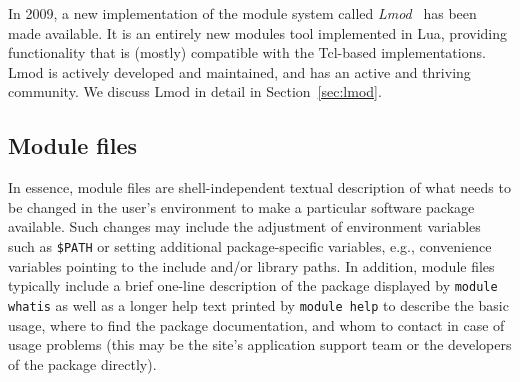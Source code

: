 In 2009, a new implementation of the module system called
\emph{Lmod}~\cite{taccLmod} has
been made available. It is an entirely new modules tool implemented in
Lua, providing functionality that is (mostly) compatible with the Tcl-based
implementations.  Lmod is actively developed and maintained, and has
an active and thriving community. We discuss Lmod in detail in
Section~\ref{sec:lmod}.


%
%

\subsection{Module files}
\label{sec:Module_files}

In essence, module files are shell-independent textual description of
what needs to be changed in the user's environment to make a
particular software package available. Such changes may include the
adjustment of environment variables such as \texttt{\$PATH} or setting
additional package-specific variables, e.g., convenience
variables pointing to the include and/or library paths.  In addition,
module files typically include a brief one-line description of the
package displayed by \texttt{module whatis} as well as a longer help
text printed by \texttt{module help} to describe the basic usage,
where to find the package documentation, and whom to contact in case
of usage problems (this may be the site's application support team or
the developers of the package directly).


